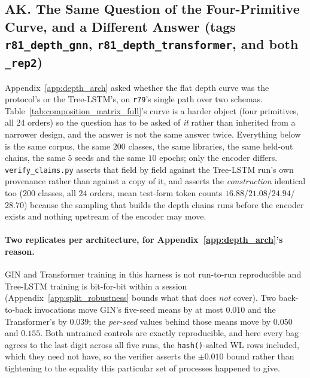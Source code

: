 \subsection*{AK. The Same Question of the Four-Primitive Curve, and a Different Answer (tags \texttt{r81\_depth\_gnn}, \texttt{r81\_depth\_transformer}, and both \texttt{\_rep2})}

Appendix~\ref{app:depth_arch} asked whether the flat depth curve was the protocol's or the Tree-LSTM's, on \texttt{r79}'s single path over two schemas. Table~\ref{tab:composition_matrix_full}'s curve is a harder object (four primitives, all 24 orders) so the question has to be asked of \emph{it} rather than inherited from a narrower design, and the answer is not the same answer twice. Everything below is the same corpus, the same $200$ classes, the same libraries, the same held-out chains, the same $5$ seeds and the same $10$ epochs; only the encoder differs. \texttt{verify\_claims.py} asserts that field by field against the Tree-LSTM run's own provenance rather than against a copy of it, and asserts the \emph{construction} identical too ($200$ classes, all $24$ orders, mean test-form token counts $16.88$/$21.08$/$24.94$/$28.70$) because the sampling that builds the depth chains runs before the encoder exists and nothing upstream of the encoder may move.

\paragraph{Two replicates per architecture, for Appendix~\ref{app:depth_arch}'s reason.} GIN and Transformer training in this harness is not run-to-run reproducible and Tree-LSTM training is bit-for-bit within a session (Appendix~\ref{app:split_robustness} bounds what that does \emph{not} cover). Two back-to-back invocations move GIN's five-seed means by at most $0.010$ and the Transformer's by $0.039$; the \emph{per-seed} values behind those means move by $0.050$ and $0.155$. Both untrained controls are exactly reproducible, and here every bag agrees to the last digit across all five runs, the \texttt{hash()}-salted WL rows included, which they need not have, so the verifier asserts the ${\pm}0.010$ bound rather than tightening to the equality this particular set of processes happened to give.


